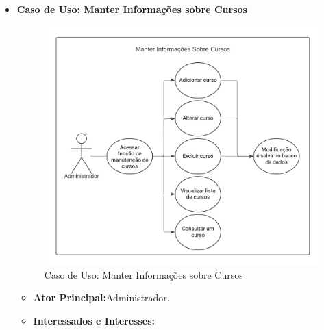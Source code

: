 \begin{itemize}
    \item \textbf{Caso de Uso: Manter Informações sobre Cursos}

    \begin{figure}[ht]
        \centering
        \includegraphics[scale=0.8]{caso-de-uso_manter-informações-sobre-cursos.png}
        \caption{Caso de Uso: Manter Informações sobre Cursos}
        \label{fig:enter-label}
    \end{figure}

    \begin{itemize}
        \item \textbf{Ator Principal:}Administrador.
        \item \textbf{Interessados e Interesses:}


\end{itemize}
\end{itemize}
